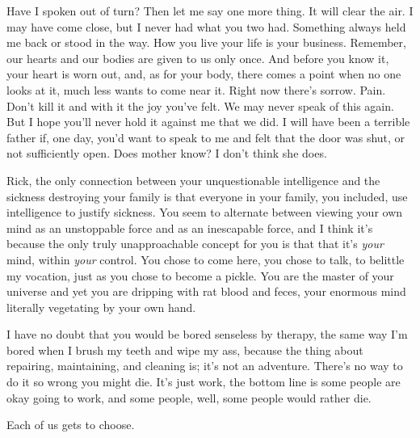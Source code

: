 \documentclass[../butidigress.tex]{subfiles}
\begin{document}
\begin{drama}
\perlmanspeaks{} Have I spoken out of turn?
\perlmanspeaks{} Then let me say one more thing. It will clear the air. I may have come close, but I never had what you two had. Something always held me back or stood in the way. How you live your life is your business. Remember, our hearts and our bodies are given to us only once. And before you know it, your heart is worn out, and, as for your body, there comes a point when no one looks at it, much less wants to come near it. Right now there's sorrow. Pain. Don't kill it and with it the joy you've felt.
\perlmanspeaks{} We may never speak of this again. But I hope you'll never hold it against me that we did. I will have been a terrible father if, one day, you'd want to speak to me and felt that the door was shut, or not sufficiently open.
\eliospeaks Does mother know?
\perlmanspeaks I don't think she does.
\end{drama}

\newpage

\begin{drama}
\wongspeaks Rick, the only connection between your unquestionable intelligence and the sickness destroying your family is that everyone in your family, you included, use intelligence to justify sickness. You seem to alternate between viewing your own mind as an unstoppable force and as an inescapable force, and I think it's because the only truly unapproachable concept for you is that that it's \emph{your} mind, within \emph{your} control. You chose to come here, you chose to talk, to belittle my vocation, just as you chose to become a pickle. You are the master of your universe and yet you are dripping with rat blood and feces, your enormous mind literally vegetating by your own hand. \par I have no doubt that you would be bored senseless by therapy, the same way I'm bored when I brush my teeth and wipe my ass, because the thing about repairing, maintaining, and cleaning is; it's not an adventure. There's no way to do it so wrong you might die. It's just work, the bottom line is some people are okay going to work, and some people, well, some people would rather die. \par Each of us gets to choose.
\end{drama}
\end{document}
